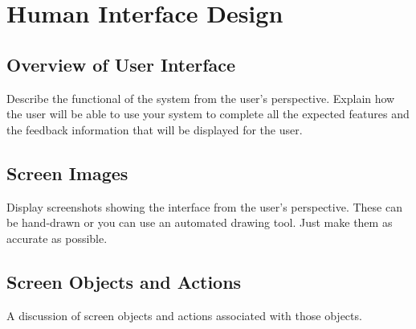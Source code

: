 \documentclass[a4paper, 12pt]{article}
\begin{document}
\section{Human Interface Design} \label{sec:human}
\subsection{Overview of User Interface} \label{sec:ui}
\begin{adjustwidth}{2em}{0pt}
Describe the functional of the system from the user’s perspective. Explain how the user will be able to use your system to complete all the expected features and the feedback information that will be displayed for the user.
\end{adjustwidth}

\subsection{Screen Images} \label{sec:screen}
\begin{adjustwidth}{2em}{0pt}
Display screenshots showing the interface from the user’s perspective. These can be hand-drawn or you can use an automated drawing tool. Just make them as accurate as possible.
\end{adjustwidth}

\subsection{Screen Objects and Actions} \label{sec:obs}
\begin{adjustwidth}{2em}{0pt}
A discussion of screen objects and actions associated with those objects. 
\end{adjustwidth}
\end{document}
